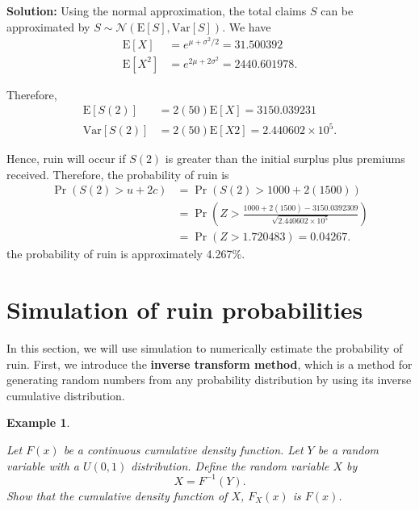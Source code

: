 \documentclass[landscape, 20pt]{extreport}
\theoremstyle{definition}
\theoremstyle{definition}
\newtheorem{example}{Example}[chapter]
\theoremstyle{definition}
\theoremstyle{definition}
\theoremstyle{remark}
\begin{document}
\textbf{Solution:} Using the normal approximation, the total claims \(S\) can be approximated by \(S \sim \mathcal{N}(\mathrm{E}[S], \mathrm{Var}[S])\). We have
\begin{align}
\mathrm{E}[X] &= e^{\mu + \sigma^2/2} = 31.500392 \\
\mathrm{E}[X^2] &= e^{2\mu + 2\sigma^2} = 2440.601978.
\end{align}

Therefore,
\begin{align}
\mathrm{E}[S(2)] &= 2(50)\mathrm{E}[X] = 3150.039231 \\
\mathrm{Var}[S(2)] &= 2(50)\mathrm{E}[X2] = \ensuremath{2.440602\times 10^{5}} .
\end{align}

Hence, ruin will occur if \(S(2)\) is greater than the initial surplus plus premiums received. Therefore, the probability of ruin is
\begin{align}
\Pr(S(2) > u + 2c) &= \Pr(S(2) > 1000 + 2(1500)) \\
&= \Pr(Z > \frac{1000 + 2(1500)  - 3150.0392309}{\sqrt{\ensuremath{2.440602\times 10^{5}}}}) \\
&= \Pr(Z > 1.720483)  = 0.04267.
\end{align}
the probability of ruin is approximately 4.267\%.

\hypertarget{simulation-of-ruin-probabilities}{%
\section{Simulation of ruin probabilities}\label{simulation-of-ruin-probabilities}}

In this section, we will use simulation to numerically estimate the probability of ruin. First, we introduce the \textbf{inverse transform method}, which is a method for generating random numbers from any probability distribution by using its inverse cumulative distribution.

\newpage \begin{example}
\protect\hypertarget{exm:unlabeled-div-59}{}\label{exm:unlabeled-div-59}

\emph{Let \(F(x)\) be a continuous cumulative density
function. Let \(Y\) be a random variable with a \(U(0,1)\) distribution.
Define the random variable \(X\) by \[X = F^{-1}(Y).\] Show that the
cumulative density function of \(X\), \(F_X(x)\) is \(F(x)\).}

\end{example}
\end{document}
